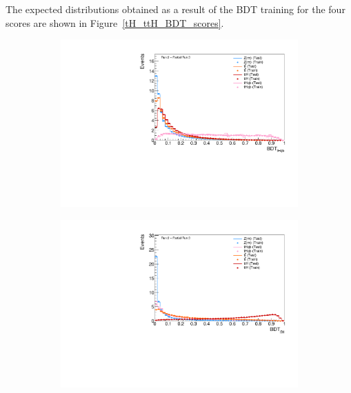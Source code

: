 The expected distributions obtained as a result of the BDT training for the four scores are shown in Figure~\ref{tH_ttH_BDT_scores}.
\begin{figure}[htbp]
  \centering
  \begin{subfigure}[b]{0.49\textwidth}
    \centering
    \includegraphics[width=\textwidth]{images/plots_tH_tHqb_for_thesis/BDTScore_tH_ATLAS.pdf}
    \caption{}
    \label{fig:bdtscore_th}
  \end{subfigure}
  \hfill
  \begin{subfigure}[b]{0.49\textwidth}
    \centering
    \includegraphics[width=\textwidth]{images/plots_tH_tHqb_for_thesis/BDTScore_ttH_ATLAS.pdf}
    \caption{}
    \label{fig:bdtscore_tth}
  \end{subfigure}


\end{figure}
